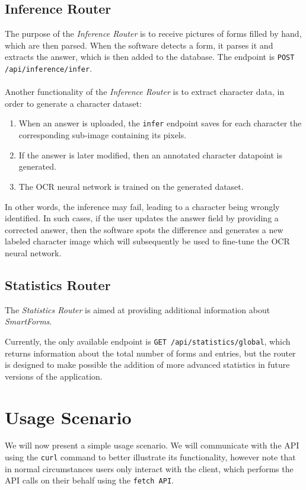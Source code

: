 \documentclass[11pt, a4paper]{report}
\def\code#1{\texttt{#1}}
\begin{document}
\subsection{Inference Router}

The purpose of the \textit{Inference Router} is to receive pictures of forms filled by hand, which are then parsed.
When the software detects a form, it parses it and extracts the answer, which is then added to the database. The endpoint is \code{POST /api/inference/infer}.
\\ \\
Another functionality of the \textit{Inference Router} is to extract character data, in order to generate a character dataset:
\begin{enumerate}
    \item When an answer is uploaded, the \code{infer} endpoint saves for each character the corresponding sub-image containing its pixels.
    \item If the answer is later modified, then an annotated character datapoint is generated.
    \item The OCR neural network is trained on the generated dataset.
\end{enumerate}

In other words, the inference may fail, leading to a character being wrongly identified. In such cases, if the user updates the answer field by providing a corrected answer, then the software spots the difference and  generates a new labeled character image which will subsequently be used to fine-tune the OCR neural network.

\subsection{Statistics Router}

The \textit{Statistics Router} is aimed at providing additional information about \textit{SmartForms}.

Currently, the only available endpoint is \code{GET /api/statistics/global}, which returns information about the total number of forms and entries, but the router is designed to make possible the addition of more advanced statistics in future versions of the application.

\section{Usage Scenario}

We will now present a simple usage scenario. We will communicate with the API using the \code{curl} command to better illustrate its functionality, however note that in normal circumstances users only interact with the client, which performs the API calls on their behalf using the \code{fetch API}.
\end{document}
